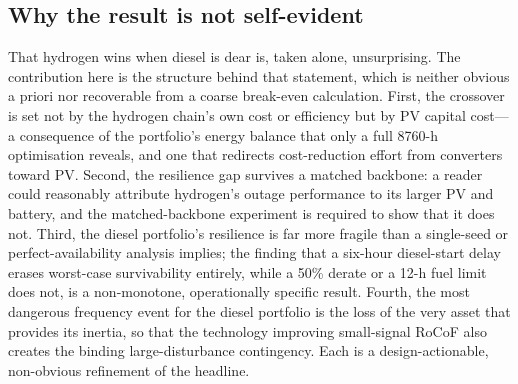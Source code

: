 \documentclass[preprint,12pt]{elsarticle}
\begin{document}
\subsection{Why the result is not self-evident}
That hydrogen wins when diesel is dear is, taken alone, unsurprising. The
contribution here is the structure behind that statement, which is neither obvious a
priori nor recoverable from a coarse break-even calculation. First, the crossover is
set not by the hydrogen chain's own cost or efficiency but by PV capital
cost---a consequence of the portfolio's energy balance that only a full 8760-h
optimisation reveals, and one that redirects cost-reduction effort from converters
toward PV. Second, the resilience gap survives a matched backbone: a reader could
reasonably attribute hydrogen's outage performance to its larger PV and battery, and
the matched-backbone experiment is required to show that it does not. Third, the
diesel portfolio's resilience is far more fragile than a single-seed or
perfect-availability analysis implies; the finding that a six-hour diesel-start
delay erases worst-case survivability entirely, while a 50\% derate or a 12-h fuel
limit does not, is a non-monotone, operationally specific result. Fourth, the most
dangerous frequency event for the diesel portfolio is the loss of the very asset
that provides its inertia, so that the technology improving small-signal RoCoF also
creates the binding large-disturbance contingency. Each is a design-actionable,
non-obvious refinement of the headline.
\end{document}
